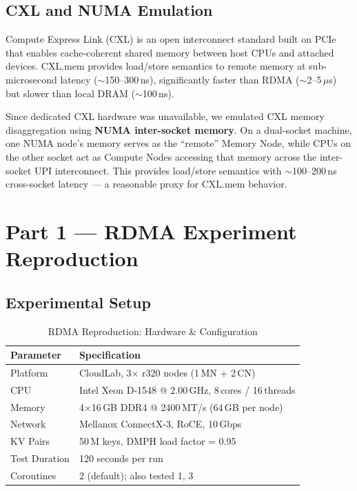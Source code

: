 \documentclass[11pt,a4paper]{article}
\begin{document}
\subsection{CXL and NUMA Emulation}

Compute Express Link (CXL) is an open interconnect standard built on PCIe that enables cache-coherent shared memory between host CPUs and attached devices. CXL.mem provides load/store semantics to remote memory at sub-microsecond latency ($\sim$150--300\,ns), significantly faster than RDMA ($\sim$2--5\,$\mu$s) but slower than local DRAM ($\sim$100\,ns).

Since dedicated CXL hardware was unavailable, we emulated CXL memory disaggregation using \textbf{NUMA inter-socket memory}. On a dual-socket machine, one NUMA node's memory serves as the ``remote'' Memory Node, while CPUs on the other socket act as Compute Nodes accessing that memory across the inter-socket UPI interconnect. This provides load/store semantics with $\sim$100--200\,ns cross-socket latency --- a reasonable proxy for CXL.mem behavior.

\section{Part 1 --- RDMA Experiment Reproduction}

\subsection{Experimental Setup}

\begin{table}[H]
\centering
\caption{RDMA Reproduction: Hardware \& Configuration}
\label{tab:rdma-setup}
\begin{tabular}{@{}ll@{}}
\toprule
\textbf{Parameter} & \textbf{Specification} \\
\midrule
Platform   & CloudLab, 3$\times$ r320 nodes (1\,MN + 2\,CN) \\
CPU        & Intel Xeon D-1548 @ 2.00\,GHz, 8\,cores / 16\,threads \\
Memory     & 4$\times$16\,GB DDR4 @ 2400\,MT/s (64\,GB per node) \\
Network    & Mellanox ConnectX-3, RoCE, 10\,Gbps \\
KV Pairs   & 50\,M keys, DMPH load factor = 0.95 \\
Test Duration & 120 seconds per run \\
Coroutines & 2 (default); also tested 1, 3 \\
\bottomrule
\end{tabular}
\end{table}
\end{document}
